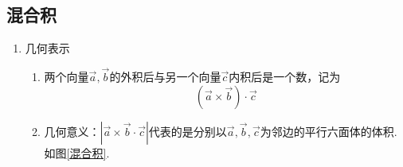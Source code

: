 \subsection{混合积}
\begin{enumerate}[1.]
			\setlength{\itemindent}{1.5em} 
	\setlength{\topsep}{0.01em}
	\setlength{\itemsep}{0.01em}
	\item {\color{dy2}几何表示}
	\begin{enumerate}[]
				\setlength{\itemindent}{1.5em} 
		\setlength{\topsep}{0.01em}
		\setlength{\itemsep}{0.01em}
		\item 两个向量$\overrightarrow{a},\overrightarrow{b}$的外积后与另一个向量$\overrightarrow{c}$内积后是一个数，记为
		\begin{equation}
			\left( \overrightarrow{a}\times\overrightarrow{b}\right) \cdot \overrightarrow{c}
		\end{equation}
		\item {\color{dy}几何意义}\label{混合积的几何意义}：$\left|\overrightarrow{a}\times\overrightarrow{b}\cdot \overrightarrow{c} \right|$代表的是分别以$\overrightarrow{a},\overrightarrow{b},\overrightarrow{c}$为邻边的平行六面体的体积. 如图\ref{混合积}.
	\end{enumerate}


\end{enumerate}
